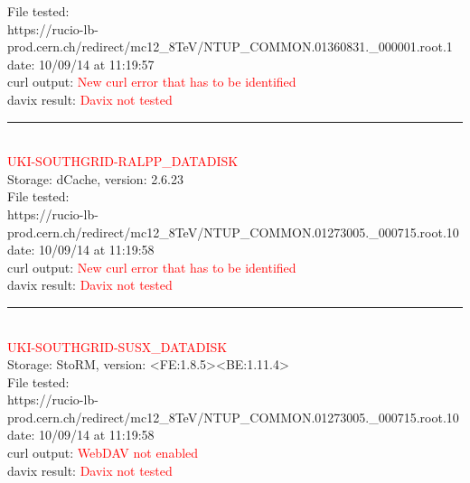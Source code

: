File tested:\\
\footnotesize{https://rucio-lb-prod.cern.ch/redirect/mc12\_8TeV/NTUP\_COMMON.01360831.\_000001.root.1}\\

date: 10/09/14 at 11:19:57\\

curl output:  \textcolor{red}{New curl error that has to be identified}\\

davix result:  \textcolor{red}{Davix not tested}\\

\rule{\textwidth}{1pt}\\

\textcolor{red}{\normalsize{UKI-SOUTHGRID-RALPP\_DATADISK}}\\

Storage: dCache, version: 2.6.23\\

File tested:\\
\footnotesize{https://rucio-lb-prod.cern.ch/redirect/mc12\_8TeV/NTUP\_COMMON.01273005.\_000715.root.10}\\

date: 10/09/14 at 11:19:58\\

curl output:  \textcolor{red}{New curl error that has to be identified}\\

davix result:  \textcolor{red}{Davix not tested}\\

\rule{\textwidth}{1pt}\\

\textcolor{red}{\normalsize{UKI-SOUTHGRID-SUSX\_DATADISK}}\\

Storage: StoRM, version: <FE:1.8.5><BE:1.11.4>\\

File tested:\\
\footnotesize{https://rucio-lb-prod.cern.ch/redirect/mc12\_8TeV/NTUP\_COMMON.01273005.\_000715.root.10}\\

date: 10/09/14 at 11:19:58\\

curl output:  \textcolor{red}{WebDAV not enabled}\\

davix result:  \textcolor{red}{Davix not tested}\\

